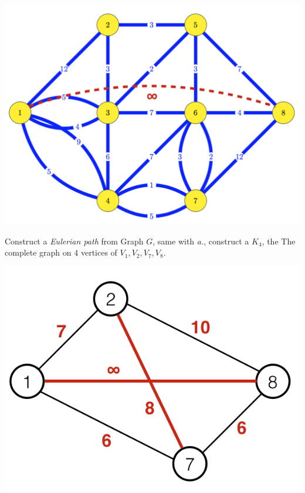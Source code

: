 \documentclass{article}
\begin{document}
{{        \begin{center}{
            \includegraphics[scale=0.6]{P10_3.png}
        }
        \end{center}

        Construct a \textit{Eulerian path} from Graph \(\mathit{G}\), same with \textit{a.}, construct a \(\mathit{K}_{\mathrm{4}}\), the The complete graph on \(\mathrm{4}\) vertices of \(\mathit{V}_{\mathrm{1}}, \mathit{V}_{\mathrm{2}}, \mathit{V}_{\mathrm{7}}, \mathit{V}_{\mathrm{8}}\).

        \begin{center}{
            \includegraphics[scale=0.6]{P10_4.png}
        }
        \end{center}

}}
\end{document}
